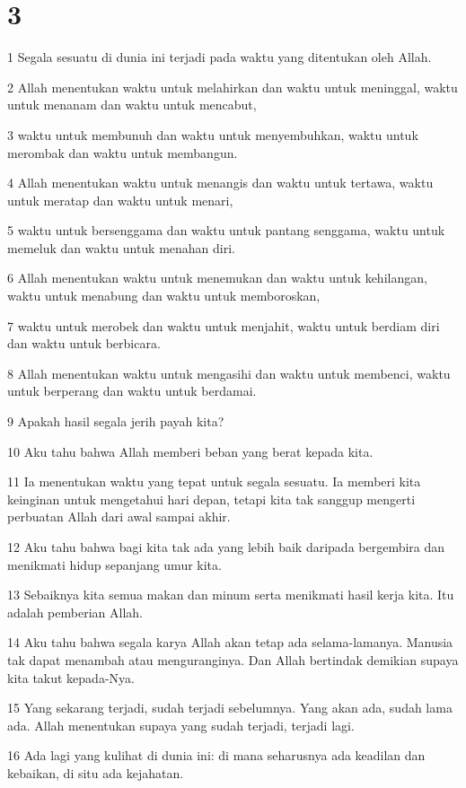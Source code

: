 \chapter{3}

\par 1 Segala sesuatu di dunia ini terjadi pada waktu yang ditentukan oleh Allah.
\par 2 Allah menentukan waktu untuk melahirkan dan waktu untuk meninggal, waktu untuk menanam dan waktu untuk mencabut,
\par 3 waktu untuk membunuh dan waktu untuk menyembuhkan, waktu untuk merombak dan waktu untuk membangun.
\par 4 Allah menentukan waktu untuk menangis dan waktu untuk tertawa, waktu untuk meratap dan waktu untuk menari,
\par 5 waktu untuk bersenggama dan waktu untuk pantang senggama, waktu untuk memeluk dan waktu untuk menahan diri.
\par 6 Allah menentukan waktu untuk menemukan dan waktu untuk kehilangan, waktu untuk menabung dan waktu untuk memboroskan,
\par 7 waktu untuk merobek dan waktu untuk menjahit, waktu untuk berdiam diri dan waktu untuk berbicara.
\par 8 Allah menentukan waktu untuk mengasihi dan waktu untuk membenci, waktu untuk berperang dan waktu untuk berdamai.
\par 9 Apakah hasil segala jerih payah kita?
\par 10 Aku tahu bahwa Allah memberi beban yang berat kepada kita.
\par 11 Ia menentukan waktu yang tepat untuk segala sesuatu. Ia memberi kita keinginan untuk mengetahui hari depan, tetapi kita tak sanggup mengerti perbuatan Allah dari awal sampai akhir.
\par 12 Aku tahu bahwa bagi kita tak ada yang lebih baik daripada bergembira dan menikmati hidup sepanjang umur kita.
\par 13 Sebaiknya kita semua makan dan minum serta menikmati hasil kerja kita. Itu adalah pemberian Allah.
\par 14 Aku tahu bahwa segala karya Allah akan tetap ada selama-lamanya. Manusia tak dapat menambah atau menguranginya. Dan Allah bertindak demikian supaya kita takut kepada-Nya.
\par 15 Yang sekarang terjadi, sudah terjadi sebelumnya. Yang akan ada, sudah lama ada. Allah menentukan supaya yang sudah terjadi, terjadi lagi.
\par 16 Ada lagi yang kulihat di dunia ini: di mana seharusnya ada keadilan dan kebaikan, di situ ada kejahatan.
